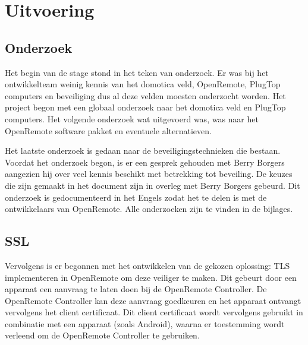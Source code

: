 \documentclass[]{article}
\begin{document}
\newpage
\section{Uitvoering}

\subsection{Onderzoek}
Het begin van de stage stond in het teken van onderzoek. Er was bij het
ontwikkelteam weinig kennis van het domotica veld, OpenRemote, PlugTop computers
en beveiliging dus al deze velden moesten onderzocht worden. Het project begon
met een globaal onderzoek naar het domotica veld en PlugTop computers. Het
volgende onderzoek wat uitgevoerd was, was naar het OpenRemote software pakket en
eventuele alternatieven.

Het laatste onderzoek is gedaan naar de beveiligingstechnieken die bestaan.
Voordat het onderzoek begon, is er een gesprek gehouden met Berry Borgers
aangezien hij over veel kennis beschikt met betrekking tot beveiling. De keuzes
die zijn gemaakt in het document zijn in overleg met Berry Borgers gebeurd. Dit
onderzoek is gedocumenteerd in het Engels zodat het te delen is met de
ontwikkelaars van OpenRemote. Alle onderzoeken zijn  te vinden in de bijlages.

\subsection{SSL}
Vervolgens is er begonnen met het ontwikkelen van de gekozen oplossing:
TLS implementeren in OpenRemote om deze veiliger te maken. Dit gebeurt
door een apparaat een aanvraag te laten doen bij de OpenRemote Controller. De
OpenRemote Controller kan deze aanvraag goedkeuren en het apparaat ontvangt
vervolgens het client certificaat. Dit client certificaat wordt vervolgens
gebruikt in combinatie met een apparaat (zoals Android), waarna er toestemming
wordt verleend om de OpenRemote Controller te gebruiken.
\end{document}
